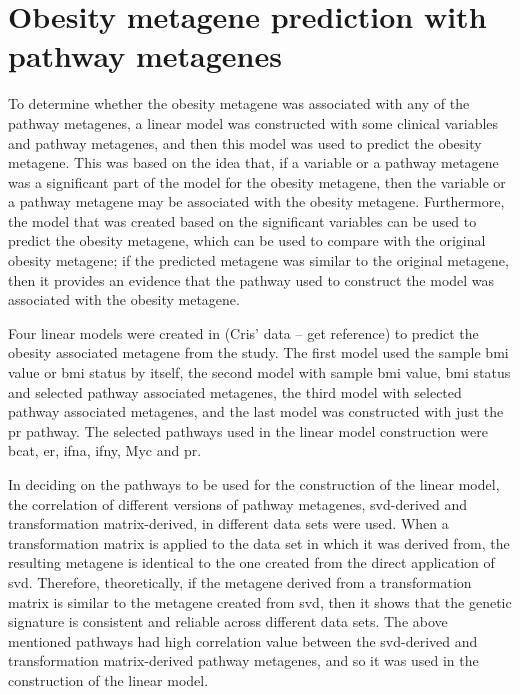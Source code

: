 \section{Obesity metagene prediction with pathway metagenes}
\label{sec:obesity_metagene_prediction_with_pathway_metagenes}

To determine whether the obesity metagene was associated with any of the pathway metagenes, a linear model was constructed with some clinical variables and pathway metagenes, and then this model was used to predict the obesity metagene.
This was based on the idea that, if a variable or a pathway metagene was a significant part of the model for the obesity metagene, then the variable or a pathway metagene may be associated with the obesity metagene.
Furthermore, the model that was created based on the significant variables can be used to predict the obesity metagene, which can be used to compare with the original obesity metagene; if the predicted metagene was similar to the original metagene, then it provides an evidence that the pathway used to construct the model was associated with the obesity metagene.

Four linear models were created in (Cris' data -- get reference) to predict the obesity associated metagene from the \citet{Creighton2012} study.
The first model used the sample \gls{bmi} value or \gls{bmi} status by itself, the second model with sample \gls{bmi} value, \gls{bmi} status and selected pathway associated metagenes, the third model with selected pathway associated metagenes, and the last model was constructed with just the \gls{pr} pathway.
The selected pathways used in the linear model construction were \gls{bcat}, \gls{er}, \gls{ifna}, \gls{ifny}, Myc and \gls{pr}.

In deciding on the pathways to be used for the construction of the linear model, the correlation of different versions of pathway metagenes, \gls{svd}-derived and transformation matrix-derived, in different data sets were used.
When a transformation matrix is applied to the data set in which it was derived from, the resulting metagene is identical to the one created from the direct application of \gls{svd}.
Therefore, theoretically, if the metagene derived from a transformation matrix is similar to the metagene created from \gls{svd}, then it shows that the genetic signature is consistent and reliable across different data sets.
The above mentioned pathways had high correlation value between the \gls{svd}-derived and transformation matrix-derived pathway metagenes, and so it was used in the construction of the linear model.

